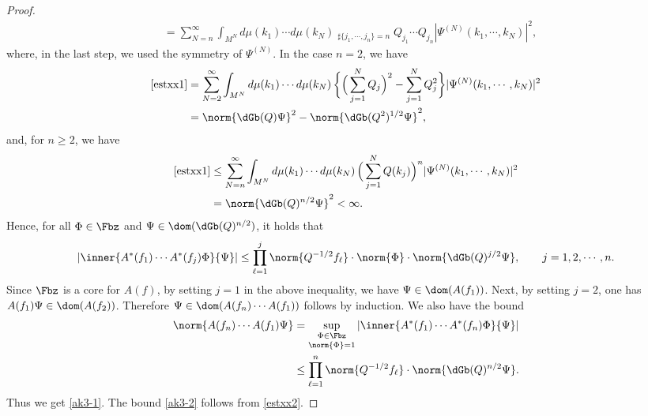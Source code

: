 \documentclass[12pt,draft]{article}
\theoremstyle{plain}
\numberwithin{equation}{section}
\theoremstyle{remark}
\begin{document}
\begin{proof}
\begin{align}
&= \sum_{N=n}^\infty  \int_{M^N} d\mu(k_1)\cdots d\mu(k_N) \mathop{\sum_{j_1,\cdots,j_n=1}^N}_{\sharp \{j_1,\cdots,j_n\}=n} 
   Q_{j_1}\cdots Q_{j_n}| \Psi^{(N)}(k_1,\cdots,k_N)|^2,  \label{estxx1}
\end{align}
where, in the last step, we used the symmetry of $\Psi^{(N)}$.
In the case $n=2$, we have 
\begin{align}
\eqref{estxx1}
& = \sum_{N=2}^\infty \int_{M^N} d\mu(k_1)\cdots d\mu(k_N)\,\bigg\{ \Big( \sum_{j=1}^N Q_j \Big)^2 -\sum_{j=1}^N Q_j^2 \bigg\} 
    |\Psi^{(N)}(k_1,\cdots,k_N)|^2 \notag \\
& = \norm{\dGb(Q)\Psi}^2 - \norm{\dGb(Q^2)^{1/2}\Psi}^2,  \label{estxx2}
\end{align}
and, for $n\geq 2$, we have
\begin{align*}
\eqref{estxx1} 
& \leq  \sum_{N=n}^\infty  \int_{M^N} d\mu(k_1)\cdots d\mu(k_N)\,\Big( \sum_{j=1}^N Q(k_j)\Big)^n | \Psi^{(N)}(k_1,\cdots,k_N)|^2 \\
& = \norm{\dGb(Q)^{n/2}\Psi} ^2 < \infty.
\end{align*}
Hence, for all $\Phi\in\Fbz$ and $\Psi\in\dom(\dGb(Q)^{n/2})$, it holds that 
\begin{align*}
  |\inner{A^*(f_1)\cdots A^*(f_j)\Phi}{\Psi}|
 \leq \prod_{\ell=1}^j \norm{Q^{-1/2}f_\ell} \cdot \norm{\Phi}\cdot \norm{\dGb(Q)^{j/2}\Psi},\qquad j=1,2,\cdots,n.
\end{align*}
Since $\Fbz$ is a core for $A(f)$, by setting $j=1$ in the above inequality, we have $\Psi\in\dom(A(f_1))$.
Next, by setting $j=2$, one has $A(f_1)\Psi \in\dom(A(f_2))$.
Therefore $\Psi\in \dom(A(f_n)\cdots A(f_1))$ follows by induction.
We also have the bound
\begin{align*}
 \norm{A(f_n)\cdots A(f_1)\Psi} 
&= \mathop{\sup_{\Phi\in\Fbz}}_\mathrm{\norm{\Phi}=1}
  |\inner{A^*(f_1)\cdots A^*(f_n)\Phi}{\Psi}| \\
& \leq \prod_{\ell=1}^n \norm{Q^{-1/2}f_\ell} \cdot \norm{\dGb(Q)^{n/2}\Psi}.
\end{align*}
Thus we get \eqref{ak3-1}. The bound \eqref{ak3-2} follows from \eqref{estxx2}.
\end{proof}
\end{document}
